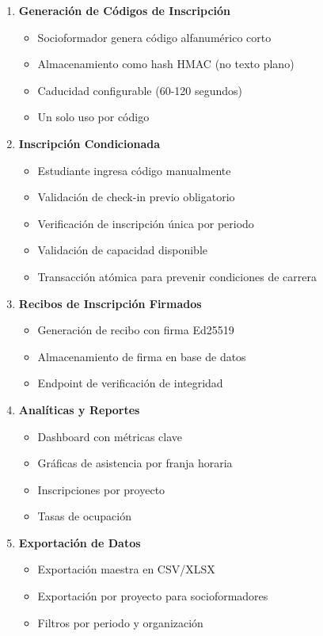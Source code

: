 \documentclass[12pt,a4paper]{article}
\begin{document}
\begin{enumerate}[leftmargin=*]
    \item \textbf{Generación de Códigos de Inscripción}
    \begin{itemize}
        \item Socioformador genera código alfanumérico corto
        \item Almacenamiento como hash HMAC (no texto plano)
        \item Caducidad configurable (60-120 segundos)
        \item Un solo uso por código
    \end{itemize}
    
    \item \textbf{Inscripción Condicionada}
    \begin{itemize}
        \item Estudiante ingresa código manualmente
        \item Validación de check-in previo obligatorio
        \item Verificación de inscripción única por periodo
        \item Validación de capacidad disponible
        \item Transacción atómica para prevenir condiciones de carrera
    \end{itemize}
    
    \item \textbf{Recibos de Inscripción Firmados}
    \begin{itemize}
        \item Generación de recibo con firma Ed25519
        \item Almacenamiento de firma en base de datos
        \item Endpoint de verificación de integridad
    \end{itemize}
    
    \item \textbf{Analíticas y Reportes}
    \begin{itemize}
        \item Dashboard con métricas clave
        \item Gráficas de asistencia por franja horaria
        \item Inscripciones por proyecto
        \item Tasas de ocupación
    \end{itemize}
    
    \item \textbf{Exportación de Datos}
    \begin{itemize}
        \item Exportación maestra en CSV/XLSX
        \item Exportación por proyecto para socioformadores
        \item Filtros por periodo y organización
    \end{itemize}
\end{enumerate}
\end{document}
